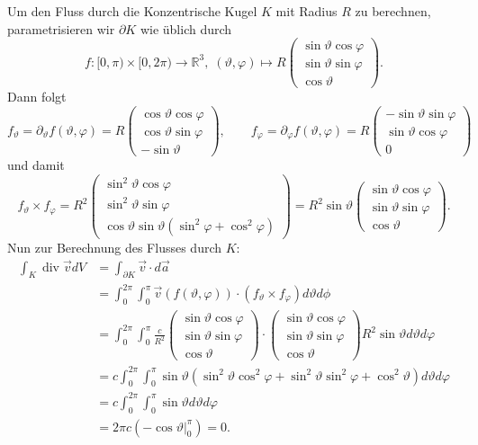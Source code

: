 \documentclass[11pt]{article}
\theoremstyle{plain}
\theoremstyle{definition}
\theoremstyle{remark}
\newcommand{\R}{\mathbb{R}}
\newcommand{\ph}{\varphi}
\renewcommand{\th}{\vartheta}
\renewcommand{\div}{\operatorname{div}}
\begin{document}
Um den Fluss durch die Konzentrische Kugel $K$ mit Radius $R$ zu berechnen, parametrisieren wir $\partial K$ wie üblich durch 
\[ f: [0, \pi) \times [0, 2\pi) \longrightarrow \R^3, \; (\th, \ph) \longmapsto R \begin{pmatrix}
\sin\th \cos\ph \\ \sin\th \sin \ph \\ \cos\th
\end{pmatrix}. \]
Dann folgt
\[ f_\th = \partial_\th f(\th, \ph) = R \begin{pmatrix}
\cos\th \cos\ph \\ \cos\th \sin\ph \\ -\sin\th
\end{pmatrix}, 
\qquad f_\ph = \partial_\ph f(\th, \ph) = R \begin{pmatrix}
-\sin\th \sin\ph \\ \sin\th \cos\ph \\ 0
\end{pmatrix} \]
und damit
\[ f_\th \times f_\ph = R^2 \begin{pmatrix}
\sin^2 \th \cos\ph \\ \sin^2 \th \sin\ph \\ \cos\th \sin\th(\sin^2 \ph + \cos^2 \ph)
\end{pmatrix}
= R^2 \sin\th \begin{pmatrix}
\sin\th \cos\ph \\ \sin\th \sin \ph \\ \cos\th
\end{pmatrix}. \]
Nun zur Berechnung des Flusses durch $K$:
\begin{align*}
\int_K \div \vec v dV &= \int_{\partial K} \vec v \cdot d\vec a \\
&= \int_{0}^{2\pi} \int_{0}^{\pi} \vec v(f(\th, \ph)) \cdot (f_\th \times f_\ph) d\th d\phi\\
&= \int_{0}^{2\pi} \int_{0}^{\pi} \frac{c}{R^2} \begin{pmatrix}
\sin\th \cos\ph \\ \sin\th \sin \ph \\ \cos\th
\end{pmatrix} \cdot \begin{pmatrix}
\sin\th \cos\ph \\ \sin\th \sin \ph \\ \cos\th
\end{pmatrix} R^2 \sin\th d\th d\ph \\
&= c \int_{0}^{2\pi} \int_{0}^{\pi} \sin\th (\sin^2 \th \cos^2 \ph +  \sin^2 \th \sin^2 \ph + \cos^2 \th) d\th d\ph \\
&= c \int_{0}^{2\pi} \int_{0}^{\pi} \sin\th d\th d\ph \\
&= 2\pi c (-\cos\th\vert_0^\pi) = 0.
\end{align*}
\end{document}
